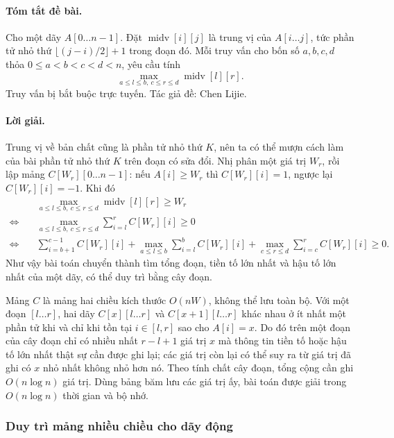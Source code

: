 \documentclass[11pt]{article}
\begin{document}
\paragraph{Tóm tắt đề bài.}
Cho một dãy \(A[0\ldots n-1]\). Đặt \(\operatorname{midv}[i][j]\) là trung vị
của \(A[i\ldots j]\), tức phần tử nhỏ thứ
\(\lfloor (j-i)/2\rfloor+1\) trong đoạn đó. Mỗi truy vấn cho bốn số
\(a,b,c,d\) thỏa \(0\le a<b<c<d<n\), yêu cầu tính
\[
  \max_{a\le l\le b,\ c\le r\le d} \operatorname{midv}[l][r].
\]
Truy vấn bị bắt buộc trực tuyến. Tác giả đề: Chen Lijie.

\paragraph{Lời giải.}
Trung vị về bản chất cũng là phần tử nhỏ thứ \(K\), nên ta có thể mượn cách
làm của bài phần tử nhỏ thứ \(K\) trên đoạn có sửa đổi. Nhị phân một giá trị
\(W_r\), rồi lập mảng \(C[W_r][0\ldots n-1]\): nếu \(A[i]\ge W_r\) thì
\(C[W_r][i]=1\), ngược lại \(C[W_r][i]=-1\). Khi đó
\[
\begin{aligned}
&\max_{a\le l\le b,\ c\le r\le d}\operatorname{midv}[l][r]\ge W_r\\
\Longleftrightarrow\quad&
\max_{a\le l\le b,\ c\le r\le d}\sum_{i=l}^{r} C[W_r][i]\ge 0\\
\Longleftrightarrow\quad&
\sum_{i=b+1}^{c-1} C[W_r][i]
 + \max_{a\le l\le b}\sum_{i=l}^{b} C[W_r][i]
 + \max_{c\le r\le d}\sum_{i=c}^{r} C[W_r][i]\ge 0.
\end{aligned}
\]
Như vậy bài toán chuyển thành tìm tổng đoạn, tiền tố lớn nhất và hậu tố lớn
nhất của một dãy, có thể duy trì bằng cây đoạn.

Mảng \(C\) là mảng hai chiều kích thước \(O(nW)\), không thể lưu toàn bộ. Với
một đoạn \([l\ldots r]\), hai dãy \(C[x][l\ldots r]\) và
\(C[x+1][l\ldots r]\) khác nhau ở ít nhất một phần tử khi và chỉ khi tồn tại
\(i\in[l,r]\) sao cho \(A[i]=x\). Do đó trên một đoạn của cây đoạn chỉ có nhiều
nhất \(r-l+1\) giá trị \(x\) mà thông tin tiền tố hoặc hậu tố lớn nhất thật sự
cần được ghi lại; các giá trị còn lại có thể suy ra từ giá trị đã ghi có
\(x\) nhỏ nhất không nhỏ hơn nó. Theo tính chất cây đoạn, tổng cộng cần ghi
\(O(n\log n)\) giá trị. Dùng bảng băm lưu các giá trị ấy, bài toán được giải
trong \(O(n\log n)\) thời gian và bộ nhớ.

\subsubsection{Duy trì mảng nhiều chiều cho dãy động}
\end{document}
